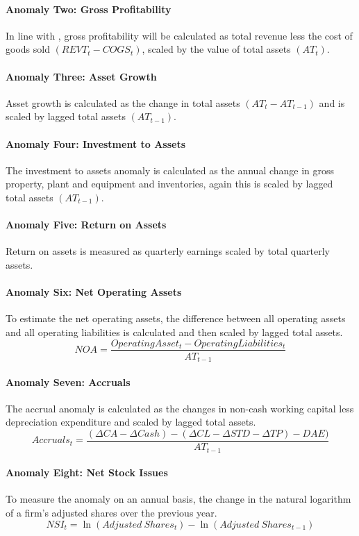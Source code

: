 \documentclass[12pt, a4paper, oneside]{article}
\begin{document}
\paragraph*{Anomaly Two: Gross Profitability}
In line with , gross profitability will be calculated as total revenue less the cost of goods sold \((REVT_t-COGS_t)\), scaled by the value of total assets $(AT_t)$. 

\paragraph*{Anomaly Three: Asset Growth}
Asset growth is calculated as the change in total assets \((AT_t  - AT_{t-1})\) and is scaled by lagged total assets \((AT_{t-1})\).

\paragraph*{Anomaly Four: Investment to Assets}
The investment to assets anomaly is calculated as the annual change in gross property, plant and equipment and inventories, again this is scaled by lagged total assets \((AT_{t-1})\). 

\paragraph*{Anomaly Five: Return on Assets}
Return on assets is measured as quarterly earnings scaled by total quarterly assets. 

\paragraph*{Anomaly Six: Net Operating Assets}
To estimate the net operating assets, the difference between all operating assets and all operating liabilities is calculated and then scaled by lagged total assets.
\[
NOA= \frac{Operating Asset_t-Operating Liabilities_t}{AT_{t-1}}\]

\paragraph*{Anomaly Seven: Accruals}
The accrual anomaly is calculated as the changes in non-cash working capital less depreciation expenditure and scaled by lagged total assets.
\[
Accruals_t = \frac{(\Delta CA - \Delta Cash) - (\Delta CL -\Delta STD -\Delta TP)-DAE)}{AT_{t-1}}
\]

\paragraph*{Anomaly Eight: Net Stock Issues}
To measure the anomaly on an annual basis, the change in the natural logarithm of a firm’s adjusted shares over the previous year. 
\[
NSI_t = \ln (Adjusted \ Shares_t ) - \ln ( Adjusted \ Shares_{t-1})
\]
\end{document}
